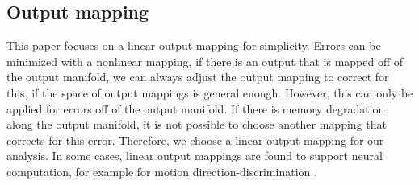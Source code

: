 \documentclass{article} %
\newcounter{ct}
\theoremstyle{definition}
\theoremstyle{remark}
\begin{document}


\subsection{Output mapping} %
This paper focuses on a linear output mapping for simplicity.
Errors can be minimized with a nonlinear mapping, if there is an output that is mapped off of the output manifold, we can always adjust the output mapping to correct for this, if the space of output mappings is general enough.
However, this can only be applied for errors off of the output manifold.
If there is memory degradation along the output manifold, it is not possible to choose another mapping that corrects for this error.
Therefore, we choose a linear output mapping for our analysis.
In some cases, linear output mappings are found to support neural computation, for example for motion direction-discrimination \citep{yates2020simple}.
\end{document}
